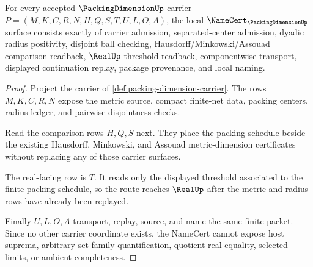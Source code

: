 \begin{theorem}
\label{thm:packing-dimension-namecert-obligations}
For every accepted $\PackingDimensionUp$ carrier
$P=(M,K,C,R,N,H,Q,S,T,U,L,O,A)$, the local
$\NameCert_{\PackingDimensionUp}$ surface consists exactly of carrier
admission, separated-center admission, dyadic radius positivity, disjoint ball
checking, Hausdorff/Minkowski/Assouad comparison readback, $\RealUp$
threshold readback, componentwise transport, displayed continuation replay,
package provenance, and local naming.
\end{theorem}
\begin{proof}
Project the carrier of \autoref{def:packing-dimension-carrier}. The rows
$M,K,C,R,N$ expose the metric source, compact finite-net data, packing
centers, radius ledger, and pairwise disjointness checks.

Read the comparison rows $H,Q,S$ next. They place the packing schedule beside
the existing Hausdorff, Minkowski, and Assouad metric-dimension certificates
without replacing any of those carrier surfaces.

The real-facing row is $T$. It reads only the displayed threshold associated
to the finite packing schedule, so the route reaches $\RealUp$ after the
metric and radius rows have already been replayed.

Finally $U,L,O,A$ transport, replay, source, and name the same finite packet.
Since no other carrier coordinate exists, the NameCert cannot expose host
suprema, arbitrary set-family quantification, quotient real equality,
selected limits, or ambient completeness.
\end{proof}


